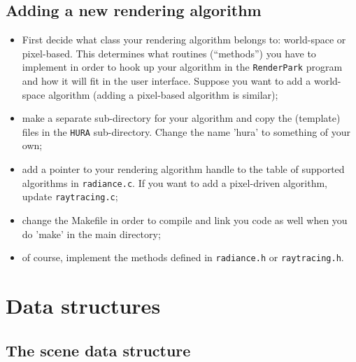 \documentclass[11pt]{report}
\begin{document}
\section{Adding a new rendering algorithm}

\begin{itemize}
\item First decide what class your rendering algorithm belongs to:
  world-space or pixel-based. This determines what routines (``methods'') 
  you have to implement in order to hook up your algorithm in the 
  {\tt RenderPark} program and how it will fit in the user interface. 
  Suppose you want to add a world-space algorithm (adding
  a pixel-based algorithm is similar);
\item make a separate sub-directory for your algorithm and copy
  the (template) files in the {\tt HURA} sub-directory. Change the name 'hura'
  to something of your own;
\item add a pointer to your rendering algorithm handle to the table of
  supported algorithms in {\tt radiance.c}. If you want to add a
  pixel-driven algorithm, update {\tt raytracing.c};
\item change the Makefile in order to compile and link you code as well
  when you do 'make' in the main directory;
\item of course, implement the methods defined in {\tt radiance.h}
  or {\tt raytracing.h}.
\end{itemize}

\chapter{Data structures}
\label{datastructures}

\section{The scene data structure}
\end{document}
